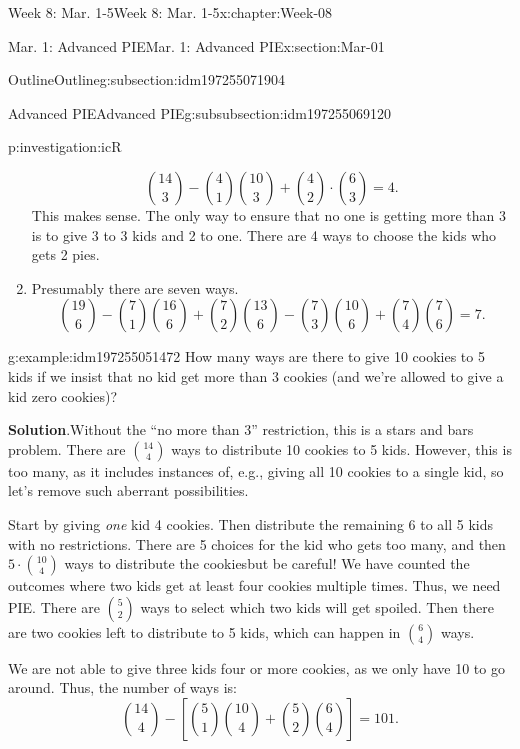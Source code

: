 \documentclass[oneside,10pt,]{book}
\newcommand{\blocktitlefont}{\relax}
\numberwithin{equation}{section}
\begin{document}
\begin{chapterptx}{Week 8: Mar. 1-5}{}{Week 8: Mar. 1-5}{}{}{x:chapter:Week-08}
\begin{sectionptx}{Mar. 1: Advanced PIE}{}{Mar. 1: Advanced PIE}{}{}{x:section:Mar-01}
\begin{subsectionptx}{Outline}{}{Outline}{}{}{g:subsection:idm197255071904}
\begin{subsubsectionptx}{Advanced PIE}{}{Advanced PIE}{}{}{g:subsubsection:idm197255069120}
\begin{investigation}{}{p:investigation:icR}
\begin{enumerate}
\begin{equation*}
\binom{14}{3} - \binom{4}{1}\binom{10}{3} + \binom{4}{2}\cdot \binom{6}{3}= 4.
\end{equation*}
This makes sense. The only way to ensure that no one is getting more than 3 is to give 3 to 3 kids and 2 to one. There are 4 ways to choose the kids who gets 2 pies.%
\item{}Presumably there are seven ways.%
\begin{equation*}
\binom{19}{6} - \binom{7}{1}\binom{16}{6} + \binom{7}{2}\binom{13}{6}-\binom{7}{3}\binom{10}{6}+\binom{7}{4}\binom{7}{6} = 7.
\end{equation*}
%
\end{enumerate}
\end{investigation}%
\begin{example}{}{g:example:idm197255051472}%
How many ways are there to give 10 cookies to 5 kids if we insist that no kid get more than 3 cookies (and we're allowed to give a kid zero cookies)?%
\par\smallskip%
\noindent\textbf{\blocktitlefont Solution}.\hypertarget{g:solution:idm197255050800}{}\quad{}Without the ``no more than 3'' restriction, this is a stars and bars problem. There are \(\binom{14}{4}\) ways to distribute 10 cookies to 5 kids. However, this is too many, as it includes instances of, e.g., giving all 10 cookies to a single kid, so let's remove such aberrant possibilities.%
\par
Start by giving \emph{one} kid 4 cookies. Then distribute the remaining 6 to all 5 kids with no restrictions. There are 5 choices for the kid who gets too many, and then \(5\cdot\binom{10}{4}\) ways to distribute the cookies\textemdash{}but be careful! We have counted the outcomes where two kids get at least four cookies multiple times. Thus, we need PIE. There are \(\binom{5}{2}\) ways to select which two kids will get spoiled. Then there are two cookies left to distribute to 5 kids, which can happen in \(\binom{6}{4}\) ways.%
\par
We are not able to give three kids four or more cookies, as we only have 10 to go around. Thus, the number of ways is:%
\begin{equation*}
\binom{14}{4} - \left[\binom{5}{1} \binom{10}{4} + \binom{5}{2}\binom{6}{4}\right] = 101.
\end{equation*}
%
\end{example}
\end{subsubsectionptx}
%
%
\typeout{************************************************}

\end{subsectionptx}
\end{sectionptx}
\end{chapterptx}
\end{document}
